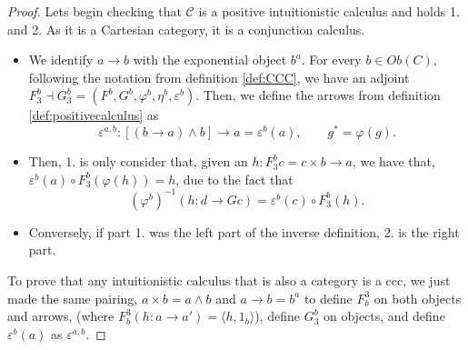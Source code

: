\begin{proof}
  
  Lets begin checking that $\mathcal{C}$ is a positive intuitionistic calculus and holds 1. and 2. As it is a Cartesian category, it is a conjunction calculus.
  \begin{itemize}
  \item We identify $a\to b$ with the exponential object $b^a$. For every $b\in Ob(C)$, following the notation from definition \ref{def:CCC}, we have an adjoint $F_3^b\dashv G_3^b = (F^b,G^b,\varphi^b,\eta^b,\varepsilon^b)$. Then, we define the arrows from definition \ref{def:positivecalculus} as
$$\varepsilon^{a,b}: [(b \to a) \land b]\to a = \varepsilon^b(a), \qquad g^* = \varphi(g).$$
\item Then, 1. is only consider that, given an $h: F_3^b c = c\times b \to a$, we have that, $\varepsilon^b(a) \circ F_3^b(\varphi(h)) = h$, due to the fact that $$(\varphi^b)^{-1}(h: d \to Gc) = \varepsilon^b(c)\circ F_3^b(h).$$
\item Conversely, if part 1. was the left part of the inverse definition, 2. is the right part.
\end{itemize}

To prove that any intuitionistic calculus that is also a category is a ccc, we just made the same pairing, $a\times b = a\land b$ and $a\to b = b^a$ to define $F_b^3$ on both objects and arrows, (where $F_b^3(h:a\to a') = \langle h, 1_b\rangle $), define $G_3^b$ on objects, and define $\varepsilon^b(a)$ as $\varepsilon^{a,b}$.











\end{proof}
